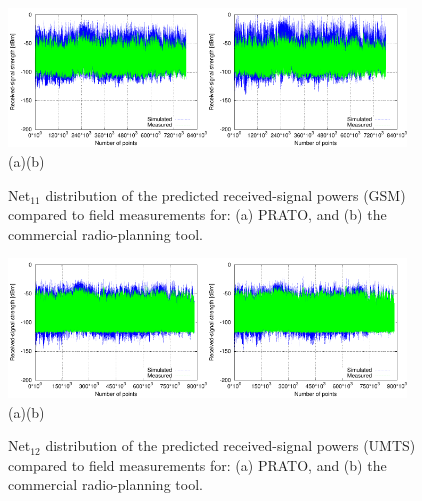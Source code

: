 \begin{figure}[h]
\centering

\includegraphics[width=0.47\textwidth]{08-real_network_planning/img/gsm_prato_rcv_pwr}\includegraphics[width=0.47\textwidth]{08-real_network_planning/img/gsm_tcpu_rcv_pwr}\\\hspace{0.4cm}(a)\hspace{6.7cm}(b)

\caption{Net$_{11}$ distribution of the predicted received-signal powers (GSM)
compared to field measurements for: (a) PRATO, and (b) the commercial
radio-planning tool.\label{fig:08-Received_signal_power-GSM}}
\end{figure}


\begin{figure}[h]
\centering

\includegraphics[width=0.47\textwidth]{08-real_network_planning/img/umts_prato_rcv_pwr}\includegraphics[width=0.47\textwidth]{08-real_network_planning/img/umts_tcpu_rcv_pwr}\\\hspace{0.4cm}(a)\hspace{6.7cm}(b)

\caption{Net$_{12}$ distribution of the predicted received-signal powers (UMTS)
compared to field measurements for: (a) PRATO, and (b) the commercial
radio-planning tool.\label{fig:08-Received_signal_power-UMTS}}
\end{figure}


